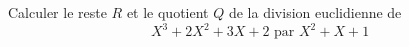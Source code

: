 Calculer le reste $R$ et le quotient $Q$ de la division euclidienne de
\begin{displaymath}
 {X}^{3}+2{X}^{2}+3X +2 \text{ par } X^2+X+1
\end{displaymath}
\bigskip \bigskip